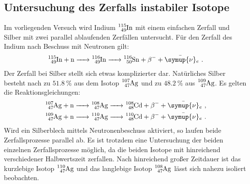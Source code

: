 \subsection{Untersuchung des Zerfalls instabiler Isotope}
Im vorliegenden Versuch wird Indium $\ce{^{115}_49In}$ mit einem einfachen Zerfall und Silber mit zwei parallel ablaufenden Zerfällen untersucht.
Für den Zerfall des Indium nach Beschuss mit Neutronen gilt:
\begin{align}
  \label{eqn:indium}
  \ce{^{115}_49In + n -> ^{116}_49In -> ^{116}_50Sn + \beta ^{-} + \bar{\symup{\nu}}_e} \text{ .}
\end{align}
Der Zerfall bei Silber stellt sich etwas komplizierter dar.
Natürliches Silber besteht nach \cite{silber} zu $\SI{51.8}{\percent}$ aus dem Isotop $\ce{^{107}_47Ag}$ und zu $\SI{48.2}{\percent}$ aus $\ce{^{109}_47Ag}$.
Es gelten die Reaktionsgleichungen:
\begin{gather}
  \label{eqn:silver}
  \ce{^{107}_47Ag + n -> ^{108}_47Ag -> ^{108}_48Cd + \beta^{-} + \bar{\symup{\nu}}_e}\text{ ,}\\
  \ce{^{109}_47Ag + n -> ^{110}_47Ag -> ^{110}_48Cd + \beta^{-} + \bar{\symup{\nu}}_e} \text{ .}
\end{gather}
Wird ein Silberblech mittels Neutronenbeschuss aktiviert, so laufen beide Zerfallsprozesse parallel ab. Es ist trotzdem eine Untersuchung der beiden einzelnen Zerfallsprozesse möglich, da die beiden Isotope mit hinreichend verschiedener Halbwertszeit zerfallen.
Nach hinreichend großer Zeitdauer ist das kurzlebige Isotop $\ce{^{110}_47Ag}$ und das langlebige Isotop $\ce{^{108}_47Ag}$ lässt sich nahezu isoliert beobachten.


